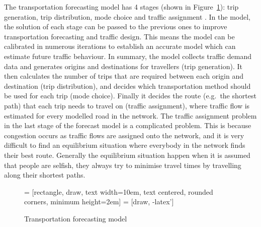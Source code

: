 The transportation forecasting model has 4 stages (shown in Figure~\ref{fig:model}):
trip generation, trip distribution, mode choice and traffic assignment \citep{Sheffi}.
In the model, the solution of each stage can be passed to the previous ones to improve transportation forecasting and traffic design.
This means the model can be calibrated in numerous iterations to establish an accurate model which can estimate future traffic behaviour.
In summary, 
the model collects traffic demand data and 
generates origins and destinations for travellers (trip generation).
It then calculates the number of trips that are required between each origin and destination (trip distribution),
and decides which transportation method should be used for each trip (mode choice).
Finally it decides the route (e.g.\ the shortest path) that each trip needs to travel on (traffic assignment), 
where traffic flow is estimated for every modelled road in the network.
The traffic assignment problem in the last stage of the forecast model is a complicated problem.
This is because congestion occurs as traffic flows are assigned onto the network,
and it is very difficult to find an equilibrium situation where everybody in the network finds their best route.
Generally the equilibrium situation happen when it is assumed that people are selfish,
they always try to minimise travel times by travelling along their shortest paths.

\begin{figure}[!ht]
    \centering
     = [rectangle, draw, text width=10em, text centered, rounded corners, minimum height=2em]
     = [draw, -latex']
    \caption{Transportation forecasting model}
    \label{fig:model}
\end{figure}

